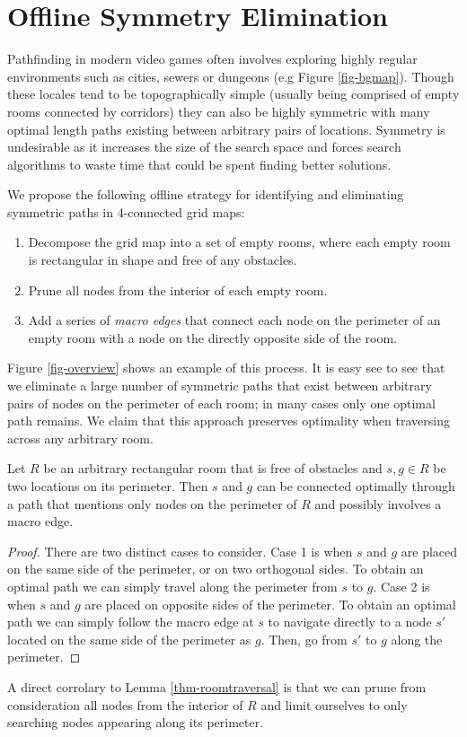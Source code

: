 \section{Offline Symmetry Elimination}
\label{algorithm}
Pathfinding in modern video games often involves exploring highly regular 
environments such as cities, sewers or dungeons (e.g Figure \ref{fig-bgmap}).
Though these locales tend to be topographically simple (usually being comprised
of empty rooms connected by corridors) they can also be highly symmetric 
with many optimal length paths existing between arbitrary pairs of locations.
Symmetry is undesirable as it increases the size of the search space
and forces search algorithms to waste time that could be spent finding better solutions.
\par
We propose the following offline strategy for identifying and eliminating symmetric paths in 
4-connected grid maps:
\begin{enumerate}
\item{Decompose the grid map into a set of empty rooms, where each empty room is 
rectangular in shape and free of any obstacles.}
\item{Prune all nodes from the interior of each empty room.}
\item{Add a series of \emph{macro edges} that connect each node on the perimeter of an empty room
with a node on the directly opposite side of the room.}
\end{enumerate}
Figure \ref{fig-overview} shows an example of this process.
It is easy see to see that we eliminate a large number of symmetric paths
that exist between arbitrary pairs of nodes on the perimeter of each room;
in many cases only one optimal path remains.
We claim that this approach preserves optimality when traversing across any arbitrary room.

\begin{lemma}
\label{thm-roomtraversal}
Let $R$ be an arbitrary rectangular room that is free of obstacles
and $s, g \in R$ be two locations on its perimeter.
Then $s$ and $g$ can be connected optimally through a path that
mentions only nodes on the perimeter of $R$ and possibly involves
a macro edge.
\end{lemma}
\begin{proof}
\par
There are two distinct cases to consider.
Case 1 is when $s$ and $g$ are placed on the same side of the perimeter, or
on two orthogonal sides. 
To obtain an optimal path we can simply travel along the perimeter from $s$ to $g$.
Case 2 is when $s$ and $g$ are placed on opposite sides of the perimeter.
To obtain an optimal path we can simply follow the macro edge at $s$ 
to navigate directly to a node $s'$ located on
the same side of the perimeter as $g$. Then, go from $s'$ to $g$ along the perimeter.
\end{proof}

A direct corrolary to Lemma \ref{thm-roomtraversal} is that we can prune from consideration
all nodes from the interior of $R$ and limit ourselves to only searching nodes appearing along its perimeter.
